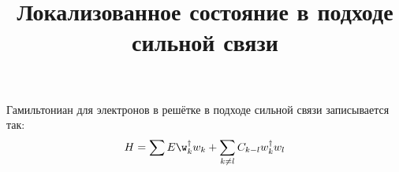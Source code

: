 \documentclass{article}
\title{Локализованное состояние в подходе сильной связи}
\begin{document}
\maketitle
Гамильтониан для электронов в решётке в подходе сильной связи записывается
так:
\begin{equation}
	H = \sum E\w_k^{\dagger}w_k + \sum_{k\ne l} C_{k-l} w_k^{\dagger} w_l
\end{equation}
\end{document}
